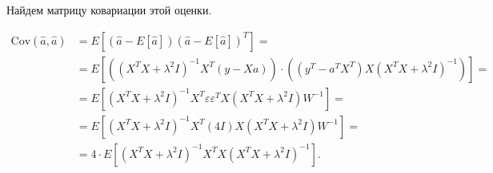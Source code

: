 \documentclass[a4paper, 12pt, onepage]{article}
\begin{document}
Найдем матрицу ковариации этой оценки.

\begin{align*}
\mbox{Cov}(\hat{a}, \hat{a})
&=  E[(\hat{a} - E[\hat{a}])(\hat{a} - E[\hat{a}])^T] = \\
&=  E[((X^TX + \lambda^2 I)^{-1} X^T (y - Xa)) \cdot ((y^T - a^T X^T) X (X^TX + \lambda^2 I)^{-1})] = \\
&=  E[(X^TX + \lambda^2 I)^{-1} X^T \varepsilon \varepsilon^T X(X^TX + \lambda^2 I)W^{-1}] = \\
&=  E[(X^TX + \lambda^2 I)^{-1} X^T (4I) X(X^TX + \lambda^2 I)W^{-1}] = \\
&=  4 \cdot E[(X^TX + \lambda^2 I)^{-1} X^T X (X^TX + \lambda^2 I)^{-1}].
\end{align*}
\end{document}
